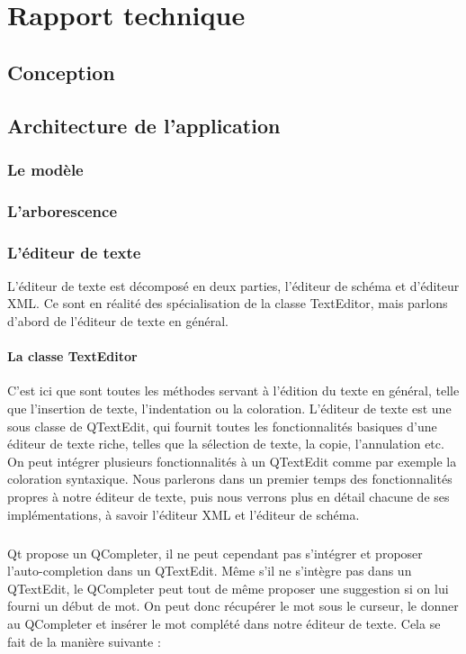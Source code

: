 \chapter{Rapport technique}

\section{Conception}


\section{Architecture de l'application}
\subsection{Le modèle}
\subsection{L'arborescence}

\subsection{L'éditeur de texte}

L'éditeur de texte est décomposé en deux parties, l'éditeur de schéma et d'éditeur XML. Ce sont en réalité des spécialisation de la classe TextEditor, mais parlons d'abord de l'éditeur de texte en général.
\subsubsection{La classe TextEditor}
C'est ici que sont toutes les méthodes servant à l'édition du texte en général, telle que l'insertion de texte, l'indentation ou la coloration. L'éditeur de texte est une sous classe de QTextEdit, qui fournit toutes les fonctionnalités basiques d'une éditeur de texte riche, telles que la sélection de texte, la copie, l'annulation etc. On peut intégrer plusieurs fonctionnalités à un QTextEdit comme par exemple la coloration syntaxique. Nous parlerons dans un premier temps des fonctionnalités propres à notre éditeur de texte, puis nous verrons plus en détail chacune de ses implémentations, à savoir l'éditeur XML et l'éditeur de schéma.

\paragraph{}
Qt propose un QCompleter, il ne peut cependant pas s'intégrer et proposer l'auto-completion dans un QTextEdit. Même s'il ne s'intègre pas dans un QTextEdit, le QCompleter peut tout de même proposer une suggestion si on lui fourni un début de mot. On peut donc récupérer le mot sous le curseur, le donner au QCompleter et insérer le mot complété dans notre éditeur de texte. Cela se fait de la manière suivante :

